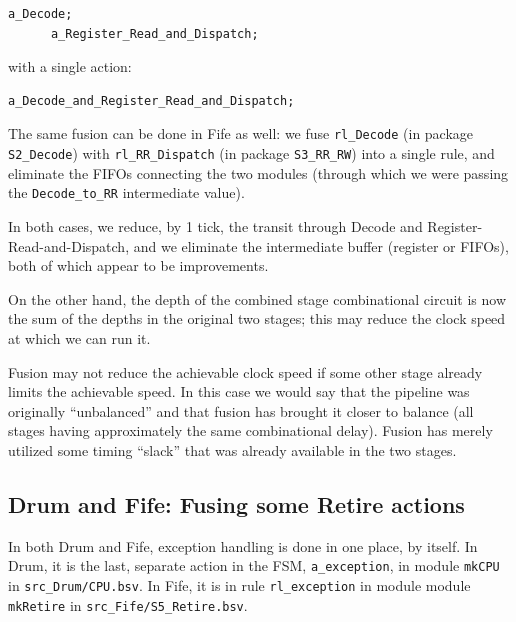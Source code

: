 {\footnotesize
\begin{Verbatim}[frame=single]
      a_Decode;
      a_Register_Read_and_Dispatch;
\end{Verbatim}
}

with a single action:

{\footnotesize
\begin{Verbatim}[frame=single]
      a_Decode_and_Register_Read_and_Dispatch;
\end{Verbatim}
}

The same fusion can be done in Fife as well: we fuse \verb|rl_Decode|
(in package \verb|S2_Decode|) with \verb|rl_RR_Dispatch| (in package
\verb|S3_RR_RW|) into a single rule, and eliminate the FIFOs
connecting the two modules (through which we were passing the
\verb|Decode_to_RR| intermediate value).

In both cases, we reduce, by 1 tick, the transit through Decode and
Register-Read-and-Dispatch, and we eliminate the intermediate buffer
(register or FIFOs), both of which appear to be improvements.

On the other hand, the depth of the combined stage combinational
circuit is now the sum of the depths in the original two stages; this
may reduce the clock speed at which we can run it.


Fusion may not reduce the achievable clock speed if some other stage
already limits the achievable speed.  In this case we would say that
the pipeline was originally ``unbalanced'' and that fusion has brought
it closer to balance (all stages having approximately the same
combinational delay).  Fusion has merely utilized some timing
``slack'' that was already available in the two stages.


\subsection{Drum and Fife: Fusing some Retire actions}

In both Drum and Fife, exception handling is done in one place, by
itself.  In Drum, it is the last, separate action in the FSM,
\verb|a_exception|, in module \verb|mkCPU| in \verb|src_Drum/CPU.bsv|.
In Fife, it is in rule \verb|rl_exception| in module module
\verb|mkRetire| in \verb|src_Fife/S5_Retire.bsv|.

